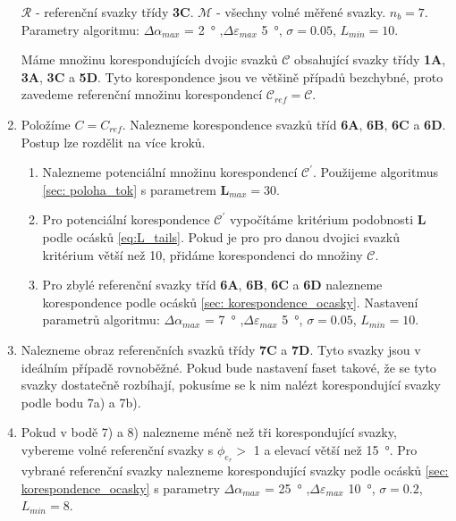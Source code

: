 \begin{enumerate}
$\mathcal{R}$ - referenční svazky třídy \textbf{3C}. $\mathcal{M}$ - všechny volné měřené svazky. $n_b= 7$. Parametry algoritmu: $\Delta\alpha_{max}$ = \SI{2}{\degree} ,$\Delta\varepsilon_{max}$ \SI{5}{\degree}, $\sigma = 0.05$, $L_{min} = 10$.

	Máme množinu korespondujících dvojic svazků $\mathcal{C}$ obsahující svazky třídy \textbf{1A}, \textbf{3A}, \textbf{3C} a \textbf{5D}. Tyto korespondence jsou ve většině případů bezchybné, proto zavedeme referenční množinu korespondencí $\mathcal{C}_{ref} = \mathcal{C}$.    

\item Položíme $C = C_{ref}$. Nalezneme korespondence svazků tříd \textbf{6A}, \textbf{6B}, \textbf{6C} a \textbf{6D}. Postup lze rozdělit na více kroků. 

\begin{enumerate}[label={\alph*)}]
	\item Nalezneme potenciální množinu korespondencí $\mathcal{C}^\prime$. Použijeme algoritmus \ref{sec: poloha_tok} s parametrem  $\mathbf{L}_{max} = 30$.
	
	\item Pro potenciální korespondence $\mathcal{C}^\prime$ vypočítáme kritérium podobnosti $\mathbf{L}$ podle ocásků \ref{eq:L_tails}. Pokud je pro pro danou dvojici svazků kritérium větší než 10, přidáme korespondenci do množiny $\mathcal{C}$. 
	
	\item Pro zbylé referenční svazky tříd \textbf{6A}, \textbf{6B}, \textbf{6C} a \textbf{6D} nalezneme korespondence podle ocásků \ref{sec: korespondence_ocasky}. Nastavení parametrů algoritmu: $\Delta\alpha_{max}$ = \SI{7}{\degree} ,$\Delta\varepsilon_{max}$ \SI{5}{\degree}, $\sigma = 0.05$, $L_{min} = 10$.
\end{enumerate}

\item Nalezneme obraz referenčních svazků třídy \textbf{7C} a \textbf{7D}. Tyto svazky jsou v ideálním případě rovnoběžné. Pokud bude nastavení faset takové, že se tyto svazky dostatečně rozbíhají, pokusíme se k nim nalézt korespondující svazky podle bodu 7a) a 7b). 

\item Pokud v bodě 7) a 8) nalezneme méně než tři korespondující svazky, vybereme volné referenční svazky s $\phi_{e_r} > $ \SI{1}{\permille} a elevací větší než \SI{15}{\degree}. Pro vybrané referenční svazky nalezneme korespondující svazky podle ocásků \ref{sec: korespondence_ocasky} s parametry $\Delta\alpha_{max}$ = \SI{25}{\degree} ,$\Delta\varepsilon_{max}$ \SI{10}{\degree}, $\sigma = 0.2$, $L_{min} = 8$.


\end{enumerate}
